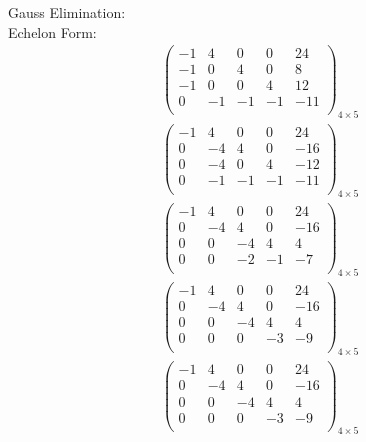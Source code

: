 \documentclass{article}
\begin{document}
Gauss Elimination:\\
Echelon Form:\\
\begin{align*}
\left(
\begin{array}{cccc|c}
-1 & 4 & 0 & 0 & 24\\
-1 & 0 & 4 & 0 & 8\\
-1 & 0 & 0 & 4 & 12\\
0 & -1 & -1 & -1 & -11\\
\end{array}
\right)_{4\times 5}
\end{align*}
\begin{align*}
\left(
\begin{array}{cccc|c}
-1 & 4 & 0 & 0 & 24\\
0 & -4 & 4 & 0 & -16\\
0 & -4 & 0 & 4 & -12\\
0 & -1 & -1 & -1 & -11\\
\end{array}
\right)_{4\times 5}
\end{align*}
\begin{align*}
\left(
\begin{array}{cccc|c}
-1 & 4 & 0 & 0 & 24\\
0 & -4 & 4 & 0 & -16\\
0 & 0 & -4 & 4 & 4\\
0 & 0 & -2 & -1 & -7\\
\end{array}
\right)_{4\times 5}
\end{align*}
\begin{align*}
\left(
\begin{array}{cccc|c}
-1 & 4 & 0 & 0 & 24\\
0 & -4 & 4 & 0 & -16\\
0 & 0 & -4 & 4 & 4\\
0 & 0 & 0 & -3 & -9\\
\end{array}
\right)_{4\times 5}
\end{align*}
\begin{align*}
\left(
\begin{array}{cccc|c}
-1 & 4 & 0 & 0 & 24\\
0 & -4 & 4 & 0 & -16\\
0 & 0 & -4 & 4 & 4\\
0 & 0 & 0 & -3 & -9\\
\end{array}
\right)_{4\times 5}
\end{align*}
\end{document}
